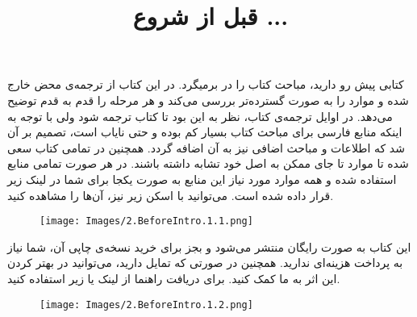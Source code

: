 \newpage

\textbf{\vspace{80pt}}
\title{
    \BTitr
    \center \Huge
    \begin{flushright}
        \textbf{قبل از شروع ...}
    \end{flushright}
}
\textbf{\vspace{80pt}}

{
    \Large
    کتابی پیش رو دارید، مباحث کتاب  را در برمیگرد.
    در این کتاب از ترجمه‌ی محض خارج شده و موارد را به صورت گسترده‌تر بررسی می‌کند و هر مرحله را قدم به قدم توضیح می‌دهد.
    در اوایل ترجمه‌ی کتاب، نظر به این بود تا کتاب ترجمه شود ولی با توجه به اینکه منابع فارسی برای مباحث کتاب بسیار کم بوده و حتی نایاب است، تصمیم بر آن شد که اطلاعات و مباحث اضافی نیز به آن اضافه گردد.
    همچنین در تمامی کتاب سعی شده تا موارد تا جای ممکن به اصل خود تشابه داشته باشند.
    در هر صورت تمامی منابع استفاده شده و همه موارد مورد نیاز این منابع به صورت یکجا برای شما در لینک زیر قرار داده شده است.
    می‌توانید با اسکن  زیر نیز، آن‌ها را مشاهده کنید.

    \begin{figure}[H]
        \centering
        \setlength{\belowcaptionskip}{-10pt}
        \texttt{[image: Images/2.BeforeIntro.1.1.png]}
        \caption*{\Large {}}
    \end{figure}

    این کتاب به صورت رایگان منتشر می‌شود و بجز برای خرید نسخه‌ی چاپی آن، شما نیاز به پرداخت هزینه‌ای ندارید.
    همچنین در صورتی که تمایل دارید، می‌توانید در بهتر کردن این اثر به ما کمک کنید. برای دریافت راهنما از لینک یا  زیر استفاده کنید.

    \begin{figure}[H]
        \centering
        \Large
        \setlength{\belowcaptionskip}{-10pt}
        \texttt{[image: Images/2.BeforeIntro.1.2.png]}
        \caption*{\Large {}}
    \end{figure}
}

